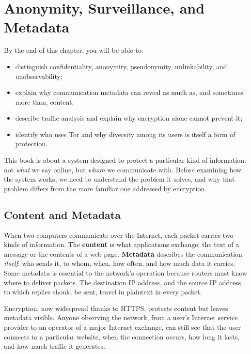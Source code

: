 \chapter{Anonymity, Surveillance, and Metadata}\label{cap:01-anonimato}

\begin{obiettivi}
By the end of this chapter, you will be able to:
\begin{itemize}[nosep]
  \item distinguish confidentiality, anonymity, pseudonymity, unlinkability, and unobservability;
  \item explain why communication metadata can reveal as much as, and sometimes more than, content;
  \item describe traffic analysis and explain why encryption alone cannot prevent it;
  \item identify who uses Tor and why diversity among its users is itself a form of protection.
\end{itemize}
\end{obiettivi}

This book is about a system designed to protect a particular kind of information: not \emph{what} we say online, but \emph{whom} we communicate with. Before examining how the system works, we need to understand the problem it solves, and why that problem differs from the more familiar one addressed by encryption.

\section{Content and Metadata}\label{sec:anon-metadati}

When two computers communicate over the Internet, each packet carries two kinds of information. The \textbf{content} is what applications exchange: the text of a message or the contents of a web page. \textbf{Metadata} describes the communication \emph{itself}: who sends it, to whom, when, how often, and how much data it carries. Some metadata is essential to the network's operation because routers must know where to deliver packets. The destination IP address, and the source IP address to which replies should be sent, travel in plaintext in every packet.

Encryption, now widespread thanks to HTTPS, protects content but leaves metadata visible. Anyone observing the network, from a user's Internet service provider to an operator of a major Internet exchange, can still see that the user connects to a particular website, when the connection occurs, how long it lasts, and how much traffic it generates.

